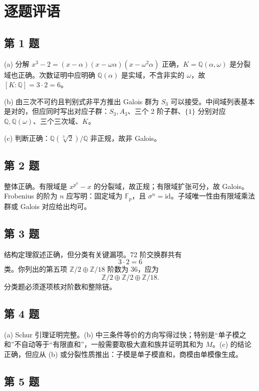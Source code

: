 \documentclass[11pt]{article}
\begin{document}
\section*{逐题评语}

\subsection*{第 1 题}

(a) 分解 \(x^3-2=(x-\alpha)(x-\omega\alpha)(x-\omega^2\alpha)\) 正确，\(K=\mathbb Q(\alpha,\omega)\) 是分裂域也正确。次数证明中应明确 \(\mathbb Q(\alpha)\) 是实域，不含非实的 \(\omega\)，故 \([K:\mathbb Q]=3\cdot2=6\)。

(b) 由三次不可约且判别式非平方推出 Galois 群为 \(S_3\) 可以接受。中间域列表基本是对的，但应同时写出对应子群：\(S_3,A_3\)、三个 2 阶子群、\(\{1\}\) 分别对应 \(\mathbb Q,\mathbb Q(\omega)\)、三个三次域、\(K\)。

(c) 判断正确：\(\mathbb Q(\sqrt[3]{2})/\mathbb Q\) 非正规，故非 Galois。

\subsection*{第 2 题}

整体正确。有限域是 \(x^{p^n}-x\) 的分裂域，故正规；有限域扩张可分，故 Galois。Frobenius 的阶为 \(n\) 应写明：固定域为 \(\mathbb F_p\)，且 \(\sigma^n=\mathrm{id}\)。子域唯一性由有限域乘法群或 Galois 对应给出均可。

\subsection*{第 3 题}

结构定理叙述正确，但分类有关键漏项。72 阶交换群共有
\[
  3\cdot2=6
\]
类。你列出的第五项 \(\mathbb Z/2\oplus\mathbb Z/18\) 阶数为 \(36\)，应为
\[
  \mathbb Z/2\oplus\mathbb Z/2\oplus\mathbb Z/18.
\]
分类题必须逐项核对阶数和整除链。

\subsection*{第 4 题}

(a) Schur 引理证明完整。(b) 中三条件等价的方向写得过快；特别是“单子模之和”不自动等于“有限直和”，一般需要取极大直和族并证明其和为 \(M\)。(c) 的结论正确，但应从 (b) 或分裂性质推出：子模是单子模直和，商模由单模像生成。

\subsection*{第 5 题}
\end{document}
